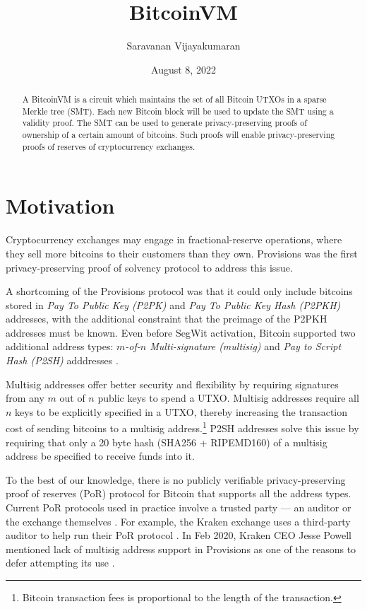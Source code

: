 \documentclass[10pt]{article}
\title{BitcoinVM}
\date{August 8, 2022}
\author{Saravanan Vijayakumaran}
\begin{document}
\maketitle
\begin{abstract}
  A BitcoinVM is a circuit which maintains the set of all Bitcoin UTXOs in a sparse Merkle tree (SMT). Each new Bitcoin block will be used to update the SMT using a validity proof. The SMT can be used to generate privacy-preserving proofs of ownership of a certain amount of bitcoins. Such proofs will enable privacy-preserving proofs of reserves of cryptocurrency exchanges.
\end{abstract}
  
\section{Motivation}%
\label{sec:motivation}
Cryptocurrency exchanges may engage in fractional-reserve operations, where they sell more bitcoins to their customers than they own. Provisions \cite{Dagher2015} was the first privacy-preserving proof of solvency protocol to address this issue.

A shortcoming of the Provisions protocol was that it could only include bitcoins stored in \textit{Pay To Public Key (P2PK)} and \textit{Pay To Public Key Hash (P2PKH)} addresses, with the additional constraint that the preimage of the P2PKH addresses must be known. Even before SegWit activation, Bitcoin supported two additional address types: \textit{$m$-of-$n$ Multi-signature (multisig)} and \textit{Pay to Script Hash (P2SH)} adddresses \cite[Section 5.5]{Vijayakumaran2017}.

Multisig addresses offer better security and flexibility by requiring signatures from any $m$ out of $n$ public keys to spend a UTXO. Multisig addresses require all $n$ keys to be explicitly specified in a UTXO, thereby increasing the transaction cost of sending bitcoins to a multisig address.\footnote{Bitcoin transaction fees is proportional to the length of the transaction.} P2SH addresses solve this issue by requiring that only a 20 byte hash (SHA256 + RIPEMD160) of a multisig address be specified to receive funds into it.

To the best of our knowledge, there is no publicly verifiable privacy-preserving proof of reserves (PoR) protocol for Bitcoin that supports all the address types. Current PoR protocols used in practice involve a trusted party --- an auditor or the exchange themselves \cite{NicCarterPoR}.  For example, the Kraken exchange uses a third-party auditor to help run their PoR protocol \cite{KrakenPoR}. In Feb 2020, Kraken CEO Jesse Powell mentioned lack of multisig address support in Provisions as one of the reasons to defer attempting its use \cite{KrakenCEO}.
\end{document}
